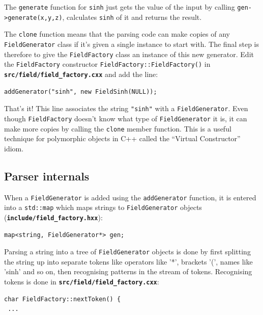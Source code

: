 \documentclass[12pt]{article}
\newcommand{\file}[1]{\texttt{\bf #1}}
\begin{document}
The \lstinline!generate! function for \lstinline!sinh! just gets the value of the input by calling
\lstinline!gen->generate(x,y,z)!, calculates \lstinline!sinh! of it and returns the result.

The \lstinline!clone! function means that the parsing code can make copies of any \lstinline!FieldGenerator! class
if it's given a single instance to start with. The final step is therefore to give the \lstinline!FieldFactory!
class an instance of this new generator. Edit the \lstinline!FieldFactory! constructor \lstinline!FieldFactory::FieldFactory()! in \file{src/field/field\_factory.cxx} and add the line:
\begin{lstlisting}[firstnumber=196]
addGenerator("sinh", new FieldSinh(NULL));
\end{lstlisting}

That's it! This line associates the string \lstinline!"sinh"! with a \lstinline!FieldGenerator!. Even
though \lstinline!FieldFactory! doesn't know what type of \lstinline!FieldGenerator! it is, it can make more copies
by calling the \lstinline!clone! member function. This is a useful technique for polymorphic objects in C++ called the
``Virtual Constructor'' idiom.

\subsection{Parser internals}

When a \lstinline!FieldGenerator! is added using the \lstinline!addGenerator! function,
it is entered into a \lstinline!std::map! which maps strings to \lstinline!FieldGenerator!
objects (\file{include/field\_factory.hxx}):

\begin{lstlisting}[firstnumber=223]
map<string, FieldGenerator*> gen;
\end{lstlisting}

Parsing a string into a tree of \lstinline!FieldGenerator! objects is done by first splitting the string up
into separate tokens like operators like '*', brackets '(', names like 'sinh' and so on, then
recognising patterns in the stream of tokens. Recognising tokens is done in \file{src/field/field\_factory.cxx}:
\begin{lstlisting}[firstnumber=259]
char FieldFactory::nextToken() {
 ...
\end{lstlisting}
\end{document}

